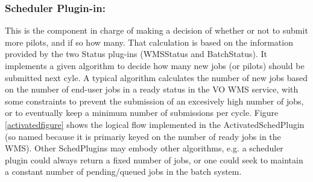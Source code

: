 \documentclass[a4paper]{jpconf}
\begin{document}
\subsubsection{Scheduler Plugin-in:}
This is the component in charge of making a decision of whether or not to submit
more pilots, and if so how many. That calculation is based on the information
provided by the two Status plug-ins (WMSStatus and BatchStatus).
It implements a given algorithm to decide how many new jobs (or pilots) should be submitted next cyle. 
A typical algorithm calculates the number of new jobs based on the number of end-user jobs in a ready status in the VO WMS service, 
with some constraints to prevent the submission of an excesively high number of jobs, 
or to eventually keep a minimum number of submissions per cycle. 
Figure \ref{activatedfigure} shows the logical flow implemented in the
ActivatedSchedPlugin (so named because it is primariy keyed on the number of
ready jobs in the WMS). Other SchedPlugins may embody other algorithms, e.g. a
scheduler plugin could always return a fixed number of jobs, or one could seek
to maintain a constant number of pending/queued jobs in the batch system. 
\end{document}
